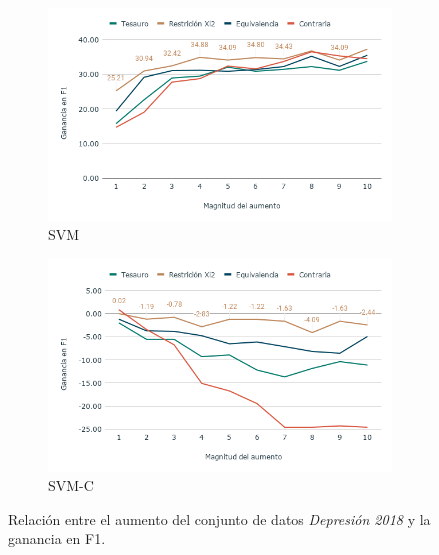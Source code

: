 \begin{figure}[hbt!]
  
    \begin{subfigure}[b]{0.5\textwidth}
        \includegraphics[width=\textwidth]{sections/figures/SVM2018.png}
        \caption{SVM}
    \end{subfigure}
    \hfill
    \begin{subfigure}[b]{0.5\textwidth}
        \includegraphics[width=\textwidth]{sections/figures/SVM-C2018.png}
        \caption{SVM-C}
    \end{subfigure}

   
    \caption{Relación entre el aumento del conjunto de datos \textit{Depresión 2018} y la ganancia en F1.}
    \label{fig:aumento_n_depresion}
\end{figure}
